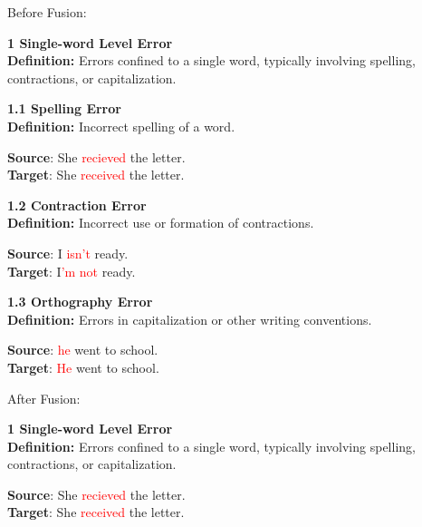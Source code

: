Before Fusion:
\begin{tcolorbox}[breakable]
\noindent \textbf{1 Single-word Level Error}\\
\textbf{Definition:} Errors confined to a single word, typically involving spelling, contractions, or capitalization.

\noindent \textbf{1.1 Spelling Error}\\
\textbf{Definition:} Incorrect spelling of a word.


\textbf{Source}: She \textcolor{red}{recieved} the letter. \\
\textbf{Target}: She \textcolor{red}{received} the letter.


\noindent \textbf{1.2 Contraction Error}\\
\textbf{Definition:} Incorrect use or formation of contractions.


\textbf{Source}: I \textcolor{red}{isn't} ready. \\
\textbf{Target}: I\textcolor{red}{'m not} ready.


\noindent \textbf{1.3 Orthography Error}\\
\textbf{Definition:} Errors in capitalization or other writing conventions.


\textbf{Source}: \textcolor{red}{he} went to school. \\
\textbf{Target}: \textcolor{red}{He} went to school.

\end{tcolorbox}
\noindent After Fusion:
\begin{tcolorbox}[breakable]
\noindent \textbf{1 Single-word Level Error}\\
\textbf{Definition:} Errors confined to a single word, typically involving spelling, contractions, or capitalization.


\textbf{Source}: She \textcolor{red}{recieved} the letter. \\
\textbf{Target}: She \textcolor{red}{received} the letter.

\end{tcolorbox}